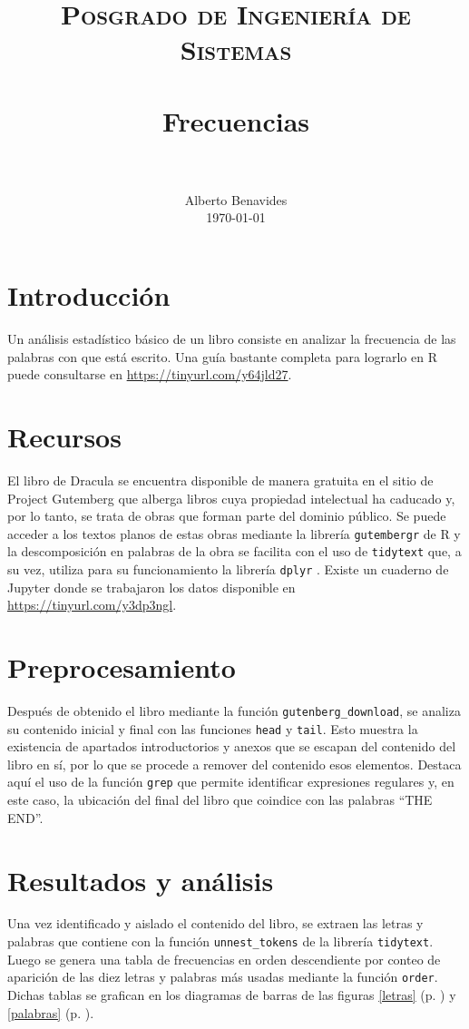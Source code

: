 \documentclass[paper=leter, fontsize=11pt]{scrartcl}
\title{
		\usefont{OT1}{bch}{b}{n}
		\normalfont \normalsize \textsc{Posgrado de Ingeniería de Sistemas} \\ [25pt]
		\horrule{0.5pt} \\[0.4cm]
		\huge Frecuencias \\
		\horrule{2pt} \\[0.5cm]
}
\author{
		\normalfont 								\normalsize
        Alberto Benavides\\[-3pt]		\normalsize
        \today
}
\date{}
\numberwithin{equation}{section}		%
\numberwithin{figure}{section}			%
\numberwithin{table}{section}				%
\begin{document}
\maketitle

\section{Introducción}

Un análisis estadístico básico de un libro consiste en analizar la frecuencia de las palabras con que está escrito. Una guía bastante completa para lograrlo en R \cite{r} puede consultarse en \url{https://tinyurl.com/y64jld27}.

\section{Recursos}

El libro de Dracula \cite{dracula} se encuentra disponible de manera gratuita en el sitio de Project Gutemberg que alberga libros cuya propiedad intelectual ha caducado y, por lo tanto, se trata de obras que forman parte del dominio público. Se puede acceder a los textos planos de estas obras mediante la librería \texttt{gutembergr} \cite{gutenbergr} de R y la descomposición en palabras de la obra se facilita con el uso de \texttt{tidytext} \cite{tidytext} que, a su vez, utiliza para su funcionamiento la librería \texttt{dplyr} \cite{dplyr}. Existe un cuaderno de Jupyter \cite{jupyter} donde se trabajaron los datos disponible en \url{https://tinyurl.com/y3dp3ngl}.

\section{Preprocesamiento}
Después de obtenido el libro mediante la función \texttt{gutenberg\_download}, se analiza su contenido inicial y final con las funciones \texttt{head} y \texttt{tail}. Esto muestra la existencia de apartados introductorios y anexos que se escapan del contenido del libro en sí, por lo que se procede a remover del contenido esos elementos. Destaca aquí el uso de la función \texttt{grep} que permite identificar expresiones regulares y, en este caso, la ubicación del final del libro que coindice con las palabras ``THE END''.

\section{Resultados y análisis}
Una vez identificado y aislado el contenido del libro, se extraen las letras y palabras que contiene con la función \texttt{unnest\_tokens} de la librería \texttt{tidytext}. Luego se genera una tabla de frecuencias en orden descendiente por conteo de aparición de las diez letras y palabras más usadas mediante la función \texttt{order}. Dichas tablas se grafican en los diagramas de barras de las figuras \ref{letras} (p. \pageref{letras}) y \ref{palabras} (p. \pageref{palabras}).
\end{document}
